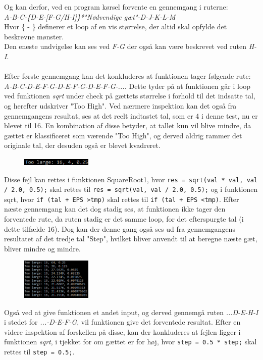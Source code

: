 \documentclass[11pt]{article}
\newcommand{\code}[1]{\colorbox{codegray}{\texttt{#1}}}
\begin{document}
    \noindent
    Og kan derfor, ved en program kørsel forvente en gennemgang i ruterne:\\
    \textit{A-B-C-\{D-E-[F-G/H-I]\}*"Nødvendige gæt"-D-J-K-L-M}\\
    Hvor \{ - \} definerer et loop af en vis størrelse, der altid skal opfylde det beskrevne mønster.\\
    Den eneste undvigelse kan ses ved \textit{F-G} der også kan være beskrevet ved ruten \textit{H-I}.\\
    \\
    Efter første gennemgang kan det konkluderes at funktionen tager følgende rute:\\
    \textit{A-B-C-D-E-F-G-D-E-F-G-D-E-F-G-....} Dette tyder på at funktionen går i loop ved funktionen \textit{sqrt} under check på gættets størrelse i forhold til det indsatte tal, og herefter udskriver "Too High".
    Ved nærmere inspektion kan det også fra gennemgangens resultat, ses at det reelt indtastet tal, som er 4 i denne test, nu er blevet til 16. En kombination af disse betyder, at tallet kun vil blive mindre, da gættet er klassificeret som værende "Too High", og derved aldrig rammer det originale tal, der desuden også er blevet kvadreret.
    \begin{figure}[H]
        \includegraphics[width=0.3\textwidth,angle=0]{Struktureret_System_Udvikling/Workshop_3/Udklip.PNG}
        \label{fig:Udklip}
    \end{figure}
    \noindent
    Disse fejl kan rettes i funktionen SquareRoot1, hvor \code{res = sqrt(val * val, val / 2.0, 0.5);} skal rettes til \code{res = sqrt(val, val / 2.0, 0.5);} og i funktionen sqrt, hvor \code{if (tal + EPS \textgreater tmp)} skal rettes til \code{if (tal + EPS \textless tmp)}.
    Efter næste gennemgang kan det dog stadig ses, at funktionen ikke tager den forventede rute, da ruten stadig er det samme loop, for det efterspurgte tal (i dette tilfælde 16). Dog kan der denne gang også ses ud fra gennemgangens resultatet af det tredje tal "Step", hvilket bliver anvendt til at beregne næste gæt, bliver mindre og mindre.
    \begin{figure}[H]
        \includegraphics[width=0.3\textwidth,angle=0]{Struktureret_System_Udvikling/Workshop_3/Udklip2.PNG}
        \label{fig:Udklip2}
    \end{figure}
    \noindent
    Også ved at give funktionen et andet input, og derved gennemgå ruten \textit{...D-E-H-I} i stedet for \textit{...-D-E-F-G}, vil funktionen give det forventede resultat.
    Efter en videre inspektion af forskellen på disse, kan der konkluderes at fejlen ligger i funktionen \textit{sqrt}, i tjekket for om gættet er for høj, hvor \code{step = 0.5 * step;} skal rettes til \code{step = 0.5;}.
\end{document}
